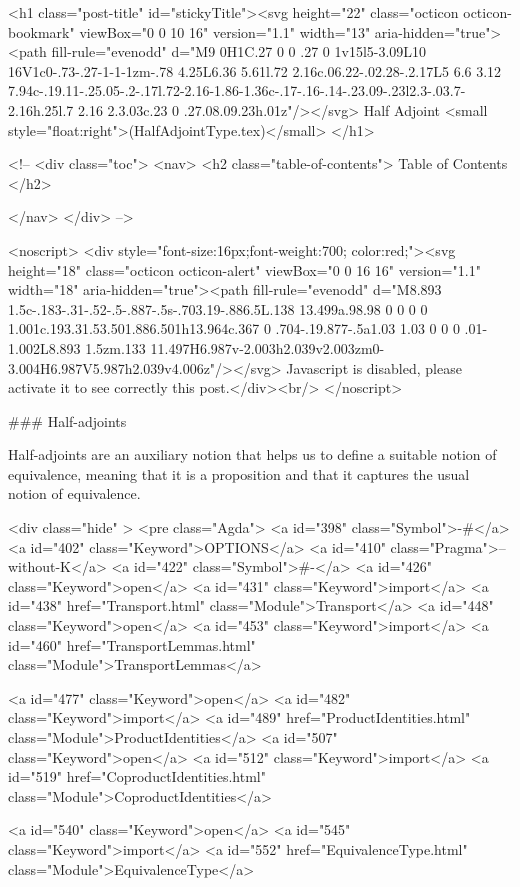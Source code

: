   <h1 class="post-title" id="stickyTitle"><svg height="22" class="octicon octicon-bookmark" viewBox="0 0 10 16" version="1.1" width="13" aria-hidden="true"><path fill-rule="evenodd" d="M9 0H1C.27 0 0 .27 0 1v15l5-3.09L10 16V1c0-.73-.27-1-1-1zm-.78 4.25L6.36 5.61l.72 2.16c.06.22-.02.28-.2.17L5 6.6 3.12 7.94c-.19.11-.25.05-.2-.17l.72-2.16-1.86-1.36c-.17-.16-.14-.23.09-.23l2.3-.03.7-2.16h.25l.7 2.16 2.3.03c.23 0 .27.08.09.23h.01z"/></svg> Half Adjoint <small style="float:right">(HalfAdjointType.tex)</small>
  </h1>

  <!-- 
  <div class="toc">
    <nav>
    <h2 class="table-of-contents"> Table of Contents </h2>
      

    </nav>
  </div>
   -->

  <noscript>
  <div style="font-size:16px;font-weight:700; color:red;"><svg height="18" class="octicon octicon-alert" viewBox="0 0 16 16" version="1.1" width="18" aria-hidden="true"><path fill-rule="evenodd" d="M8.893 1.5c-.183-.31-.52-.5-.887-.5s-.703.19-.886.5L.138 13.499a.98.98 0 0 0 0 1.001c.193.31.53.501.886.501h13.964c.367 0 .704-.19.877-.5a1.03 1.03 0 0 0 .01-1.002L8.893 1.5zm.133 11.497H6.987v-2.003h2.039v2.003zm0-3.004H6.987V5.987h2.039v4.006z"/></svg> Javascript is disabled, please activate it to see correctly this post.</div><br/>
  </noscript>

  ### Half-adjoints

Half-adjoints are an auxiliary notion that helps us to define a suitable notion
of equivalence, meaning that it is a proposition and that it captures the usual
notion of equivalence.

<div class="hide" >
<pre class="Agda">
<a id="398" class="Symbol">{-#</a> <a id="402" class="Keyword">OPTIONS</a> <a id="410" class="Pragma">--without-K</a> <a id="422" class="Symbol">#-}</a>
<a id="426" class="Keyword">open</a> <a id="431" class="Keyword">import</a> <a id="438" href="Transport.html" class="Module">Transport</a>
<a id="448" class="Keyword">open</a> <a id="453" class="Keyword">import</a> <a id="460" href="TransportLemmas.html" class="Module">TransportLemmas</a>

<a id="477" class="Keyword">open</a> <a id="482" class="Keyword">import</a> <a id="489" href="ProductIdentities.html" class="Module">ProductIdentities</a>
<a id="507" class="Keyword">open</a> <a id="512" class="Keyword">import</a> <a id="519" href="CoproductIdentities.html" class="Module">CoproductIdentities</a>

<a id="540" class="Keyword">open</a> <a id="545" class="Keyword">import</a> <a id="552" href="EquivalenceType.html" class="Module">EquivalenceType</a>

